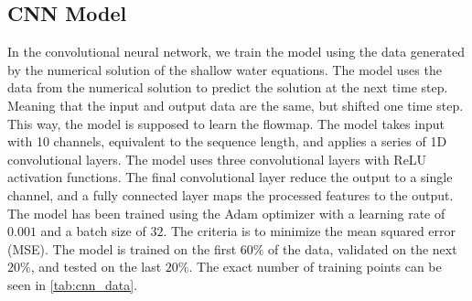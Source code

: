 \subsection*{CNN Model}
In the convolutional neural network, we train the model using the data generated by the numerical solution of the shallow water equations.
The model uses the data from the numerical solution to predict the solution at the next time step.
Meaning that the input and output data are the same, but shifted one time step. This way, the model is supposed to learn the flowmap.
The model takes input with 10 channels, equivalent to the sequence length, and applies a series of 1D convolutional layers.
The model uses three convolutional layers with ReLU activation functions.
The final convolutional layer reduce the output to a single channel, and a fully connected layer maps the processed features to the output.
The model has been trained using the Adam optimizer with a learning rate of $0.001$ and a batch size of $32$.
The criteria is to minimize the mean squared error (MSE).
The model is trained on the first $60\%$ of the data, validated on the next $20\%$, and tested on the last $20\%$.
The exact number of training points can be seen in \autoref{tab:cnn_data}.

